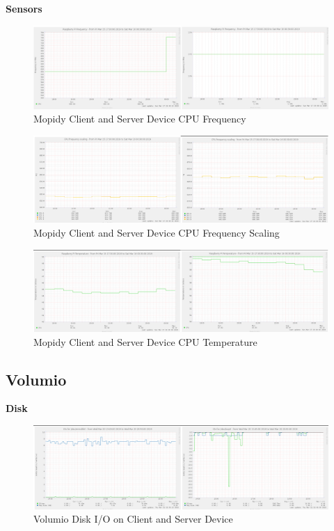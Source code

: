 \documentclass[11pt,a4paper]{scrreprt}
\begin{document}
\textbf{Sensors}

\begin{figure}[H]
\includegraphics{ResultsAndAnalysis/MopidyServerTestImages/001MopidyCPUFreq.png}
\centering
\caption{Mopidy Client and Server Device CPU Frequency}
\label{MopidyCPUFreq}
\end{figure}

\begin{figure}[H]
\includegraphics{ResultsAndAnalysis/MopidyServerTestImages/002MopidyCPUFreqScaling.png}
\centering
\caption{Mopidy Client and Server Device CPU Frequency Scaling}
\label{MopidyCPUFreqScaling}
\end{figure}

\begin{figure}[H]
\includegraphics{ResultsAndAnalysis/MopidyServerTestImages/003MopidyCPUTemp.png}
\centering
\caption{Mopidy Client and Server Device CPU Temperature}
\label{MopidyCPUTemp}
\end{figure}

\subsection{Volumio}\label{volumio-2}

\textbf{Disk}

\begin{figure}[H]
\includegraphics{ResultsAndAnalysis/VolumioServerTestImages/005VolumioDiskIO.png}
\centering
\caption{Volumio Disk I/O on Client and Server Device}
\label{VolumioDiskIO}
\end{figure}
\end{document}
